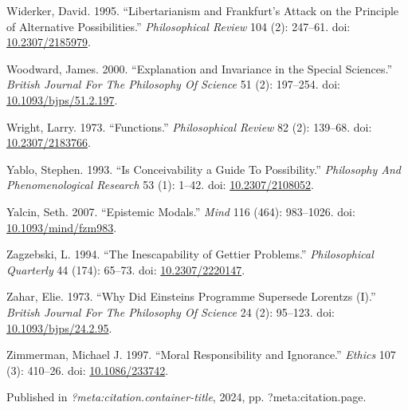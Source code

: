 \documentclass[
  10pt,
  letterpaper,
  DIV=11,
  numbers=noendperiod,
  twoside]{scrartcl}
\newlength{\cslhangindent}
\newenvironment{CSLReferences}[2] %
 {\begin{list}{}{%
  \setlength{\itemindent}{0pt}
  \setlength{\leftmargin}{0pt}
  \setlength{\parsep}{0pt}
  \ifodd #1
   \setlength{\leftmargin}{\cslhangindent}
   \setlength{\itemindent}{-1\cslhangindent}
  \fi
  \setlength{\itemsep}{#2\baselineskip}}}
 {\end{list}}
\begin{document}
\begin{CSLReferences}{1}{0}
Widerker, David. 1995. {``Libertarianism and Frankfurt's Attack on the
Principle of Alternative Possibilities.''} \emph{Philosophical Review}
104 (2): 247--61. doi:
\href{https://doi.org/10.2307/2185979}{10.2307/2185979}.

Woodward, James. 2000. {``Explanation and Invariance in the Special
Sciences.''} \emph{British Journal For The Philosophy Of Science} 51
(2): 197--254. doi:
\href{https://doi.org/10.1093/bjps/51.2.197}{10.1093/bjps/51.2.197}.

Wright, Larry. 1973. {``Functions.''} \emph{Philosophical Review} 82
(2): 139--68. doi:
\href{https://doi.org/10.2307/2183766}{10.2307/2183766}.

Yablo, Stephen. 1993. {``Is Conceivability a Guide To Possibility.''}
\emph{Philosophy And Phenomenological Research} 53 (1): 1--42. doi:
\href{https://doi.org/10.2307/2108052}{10.2307/2108052}.

Yalcin, Seth. 2007. {``Epistemic Modals.''} \emph{Mind} 116 (464):
983--1026. doi:
\href{https://doi.org/10.1093/mind/fzm983}{10.1093/mind/fzm983}.

Zagzebski, L. 1994. {``The Inescapability of Gettier Problems.''}
\emph{Philosophical Quarterly} 44 (174): 65--73. doi:
\href{https://doi.org/10.2307/2220147}{10.2307/2220147}.

Zahar, Elie. 1973. {``Why Did Einsteins Programme Supersede Lorentzs
(I).''} \emph{British Journal For The Philosophy Of Science} 24 (2):
95--123. doi:
\href{https://doi.org/10.1093/bjps/24.2.95}{10.1093/bjps/24.2.95}.

Zimmerman, Michael J. 1997. {``Moral Responsibility and Ignorance.''}
\emph{Ethics} 107 (3): 410--26. doi:
\href{https://doi.org/10.1086/233742}{10.1086/233742}.

\end{CSLReferences}



\noindent Published in\emph{
?meta:citation.container-title}, 2024, pp. ?meta:citation.page.
\end{document}
